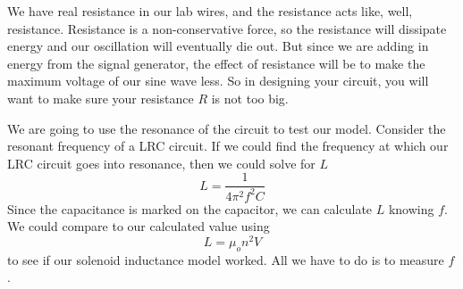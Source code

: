 We have real resistance in our lab wires,
and the resistance acts like, well, resistance. Resistance is a
non-conservative force, so the resistance will dissipate energy and our
oscillation will eventually die out. But since we are adding in energy from
the signal generator, the effect of resistance will be to make the maximum
voltage of our sine wave less. So in designing your circuit, you will want
to make sure your resistance $R$ is not too big.

We are going to use the resonance of the circuit to test our model.
Consider the resonant frequency of a LRC circuit.
If we could find the frequency at which our LRC circuit goes into
resonance, then we could solve for $L$%
\begin{equation*}
L=\frac{1}{4\pi ^{2}f^{2}C}
\end{equation*}
Since the capacitance is marked on the capacitor, we can calculate $L$
knowing $f$. We could compare to our calculated value using 
\begin{equation*}
L=\mu _{o}n^{2}V
\end{equation*}%
to see if our solenoid inductance model worked. All we have to do is to
measure $f$.

